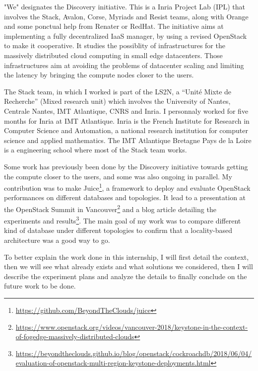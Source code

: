 "We" designates the Discovery initiative\cite{discovery}. This is a Inria Project Lab (IPL) that involves the Stack, Avalon, Corse, Myriads and Resist teams, along with Orange and some ponctual help from Renater or RedHat. The initiative aims at implementing a fully decentralized IaaS manager, by using a revised OpenStack to make it cooperative. It studies the possiblity of infrastructures for the massively distributed cloud computing in small edge datacenters. Those infrastructures aim at avoiding the problems of datacenter scaling and limiting the latency by bringing the compute nodes closer to the users.


The Stack team, in which I worked is part of the LS2N, a ``Unité Mixte de Recherche'' (Mixed research unit) which involves the University of Nantes, Centrale Nantes, IMT Atlantique, CNRS and Inria. I personnaly worked for five months for Inria at IMT Atlantique. Inria is the French Institute for Research in Computer Science and Automation, a national research institution for computer science and applied mathematics. The IMT Atlantique Bretagne Pays de la Loire is a engineering school where most of the Stack team works.

Some work has previously been done by the Discovery initiative towards getting the compute closer to the users, and some was also ongoing in parallel. My contribution was to make Juice\footnote{\url{https://github.com/BeyondTheClouds/juice}}, a framework to deploy and evaluate OpenStack performances on different databases and topologies. It lead to a presentation at the OpenStack Summit in Vancouver\footnote{\url{https://www.openstack.org/videos/vancouver-2018/keystone-in-the-context-of-fogedge-massively-distributed-clouds}} and a blog article detailing the experiments and results\footnote{\url{https://beyondtheclouds.github.io/blog/openstack/cockroachdb/2018/06/04/evaluation-of-openstack-multi-region-keystone-deployments.html}}. The main goal of my work was to compare different kind of database under different topologies to confirm that a locality-based architecture was a good way to go.

To better explain the work done in this internship, I will first detail the context, then we will see what already exists and what solutions we considered, then I will describe the experiment plans and analyze the details to finally conclude on the future work to be done.
